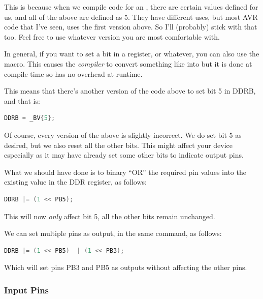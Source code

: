 This is because when we compile code for an , there are certain values defined for us, and all of the above are defined as 5. They have different uses, but most AVR code that I've seen, uses the first version above. So I'll (probably) stick with that too. Feel free to use whatever version you are most comfortable with.

\begin{note}
	In general, if you want to set a bit in a register, or whatever, you can also use the  macro. This causes the \emph{compiler} to convert something like  into  but it is done at compile time so has no overhead at runtime.
	
	This means that there's another version of the code above to set bit 5 in DDRB, and that is:
	
	\begin{lstlisting}[language=C,numbers={none}]
		DDRB = _BV{5};	\end{lstlisting}	
\end{note}	

Of course, every version of the above is slightly incorrect. We do set bit 5 as desired, but we also reset all the other bits. This might affect your device especially as it may have already set some other bits to indicate output pins.

What we should have done is to binary ``OR'' the required pin values into the existing value in the DDR register, as follows:

\begin{lstlisting}[language=C,numbers={none}]
	DDRB |= (1 << PB5);
\end{lstlisting}

This will now \emph{only} affect bit 5, all the other bits remain unchanged.

We can set multiple pins as output, in the same command, as follows:

\begin{lstlisting}[language=C,numbers={none}]
	DDRB |= (1 << PB5)  | (1 << PB3);
\end{lstlisting}

Which will set pins PB3 and PB5 as outputs without affecting  the other pins.

\subsubsection{Input Pins}\label{avr-pins-input}

